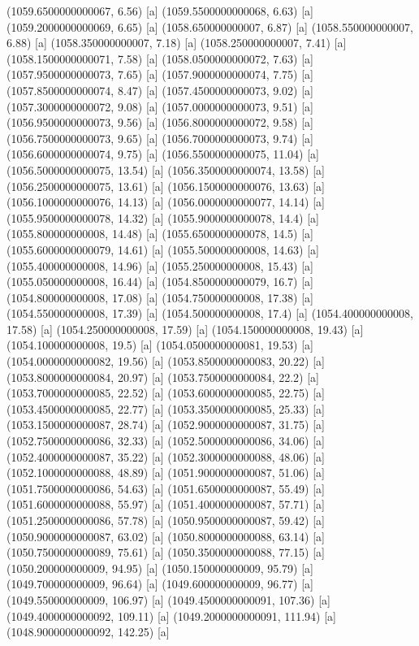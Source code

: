{{{(1059.6500000000067, 6.56) [a] 
(1059.5500000000068, 6.63) [a] 
(1059.2000000000069, 6.65) [a] 
(1058.650000000007, 6.87) [a] 
(1058.550000000007, 6.88) [a] 
(1058.350000000007, 7.18) [a] 
(1058.250000000007, 7.41) [a] 
(1058.1500000000071, 7.58) [a] 
(1058.0500000000072, 7.63) [a] 
(1057.9500000000073, 7.65) [a] 
(1057.9000000000074, 7.75) [a] 
(1057.8500000000074, 8.47) [a] 
(1057.4500000000073, 9.02) [a] 
(1057.3000000000072, 9.08) [a] 
(1057.0000000000073, 9.51) [a] 
(1056.9500000000073, 9.56) [a] 
(1056.8000000000072, 9.58) [a] 
(1056.7500000000073, 9.65) [a] 
(1056.7000000000073, 9.74) [a] 
(1056.6000000000074, 9.75) [a] 
(1056.5500000000075, 11.04) [a] 
(1056.5000000000075, 13.54) [a] 
(1056.3500000000074, 13.58) [a] 
(1056.2500000000075, 13.61) [a] 
(1056.1500000000076, 13.63) [a] 
(1056.1000000000076, 14.13) [a] 
(1056.0000000000077, 14.14) [a] 
(1055.9500000000078, 14.32) [a] 
(1055.9000000000078, 14.4) [a] 
(1055.800000000008, 14.48) [a] 
(1055.6500000000078, 14.5) [a] 
(1055.6000000000079, 14.61) [a] 
(1055.500000000008, 14.63) [a] 
(1055.400000000008, 14.96) [a] 
(1055.250000000008, 15.43) [a] 
(1055.050000000008, 16.44) [a] 
(1054.8500000000079, 16.7) [a] 
(1054.800000000008, 17.08) [a] 
(1054.750000000008, 17.38) [a] 
(1054.550000000008, 17.39) [a] 
(1054.500000000008, 17.4) [a] 
(1054.400000000008, 17.58) [a] 
(1054.250000000008, 17.59) [a] 
(1054.150000000008, 19.43) [a] 
(1054.100000000008, 19.5) [a] 
(1054.0500000000081, 19.53) [a] 
(1054.0000000000082, 19.56) [a] 
(1053.8500000000083, 20.22) [a] 
(1053.8000000000084, 20.97) [a] 
(1053.7500000000084, 22.2) [a] 
(1053.7000000000085, 22.52) [a] 
(1053.6000000000085, 22.75) [a] 
(1053.4500000000085, 22.77) [a] 
(1053.3500000000085, 25.33) [a] 
(1053.1500000000087, 28.74) [a] 
(1052.9000000000087, 31.75) [a] 
(1052.7500000000086, 32.33) [a] 
(1052.5000000000086, 34.06) [a] 
(1052.4000000000087, 35.22) [a] 
(1052.3000000000088, 48.06) [a] 
(1052.1000000000088, 48.89) [a] 
(1051.9000000000087, 51.06) [a] 
(1051.7500000000086, 54.63) [a] 
(1051.6500000000087, 55.49) [a] 
(1051.6000000000088, 55.97) [a] 
(1051.4000000000087, 57.71) [a] 
(1051.2500000000086, 57.78) [a] 
(1050.9500000000087, 59.42) [a] 
(1050.9000000000087, 63.02) [a] 
(1050.8000000000088, 63.14) [a] 
(1050.7500000000089, 75.61) [a] 
(1050.3500000000088, 77.15) [a] 
(1050.200000000009, 94.95) [a] 
(1050.150000000009, 95.79) [a] 
(1049.700000000009, 96.64) [a] 
(1049.600000000009, 96.77) [a] 
(1049.550000000009, 106.97) [a] 
(1049.4500000000091, 107.36) [a] 
(1049.4000000000092, 109.11) [a] 
(1049.2000000000091, 111.94) [a] 
(1048.9000000000092, 142.25) [a] 
}}}

